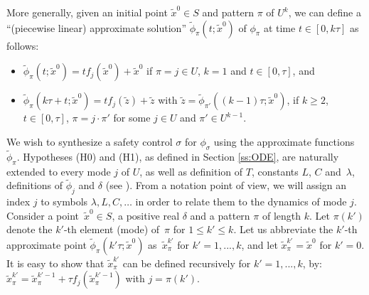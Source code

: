 More generally, given an initial point $\tilde{x}^0\in S$ and  pattern $\pi$ of $U^k$,
we can define a ``(piecewise linear) approximate solution''
$\tilde{\phi}_\pi(t;\tilde{x}^0)$ of $\phi_\pi$ at time $t\in[0,k\tau]$ as follows:
\begin{itemize}
\item $\tilde{\phi}_\pi(t;\tilde{x}^0) = t f_j(\tilde{x}^0) + \tilde{x}^0$ if $\pi=j\in U$, $k=1$ and $t\in[0,\tau]$, and

\item $\tilde{\phi}_{\pi}(k\tau+t;\tilde{x}^0) = t f_j(\tilde{z}) + \tilde{z}$
with $\tilde{z}=\tilde{\phi}_{\pi'}((k-1)\tau;\tilde{x}^0)$, if $k\geq 2$,
$t\in[0,\tau]$,
$\pi=j\cdot \pi'$ for some $j\in U$ and $\pi'\in U^{k-1}$.
\end{itemize}


We wish to synthesize a safety control $\sigma$ for $\phi_{\sigma}$
using the approximate functions $\tilde{\phi}_\pi$. %
%
Hypotheses (H0) and (H1), as defined in Section \ref{ss:ODE},
are naturally extended to every mode $j$ of $U$, as well as
definition of $T$, constants $L$, $C$ and~$\lambda$, definitions of
$\tilde{\phi}_j$ and $\delta$ (see \cite{SNR17}). From a notation point of view,
we will assign an index $j$ to symbols $\lambda, L, C,\dots$ in order to
relate them to the dynamics of mode $j$.\\

Consider a point~$\tilde{x}^0\in S$, a positive real  $\delta$ %
and a pattern $\pi$ of length $k$.
Let $\pi(k')$ denote the $k'$-th element (mode) of~$\pi$ for $1\leq k'\leq k$.
Let us abbreviate
the $k'$-th approximate point
$\tilde{\phi}_{\pi}(k'\tau;\tilde{x}^{0})$
as~$\tilde{x}_\pi^{k'}$ for $k'=1,...,k$,
and let $\tilde{x}_\pi^{k'}=\tilde{x}^0$ for $k'=0$. It is easy to show that
$\tilde{x}_\pi^{k'}$ can be defined recursively for $k'=1,...,k$, by:
$\tilde{x}_\pi^{k'}=\tilde{x}_\pi^{k'-1}+\tau f_{j}(\tilde{x}_\pi^{k'-1})$
with $j=\pi(k')$.

